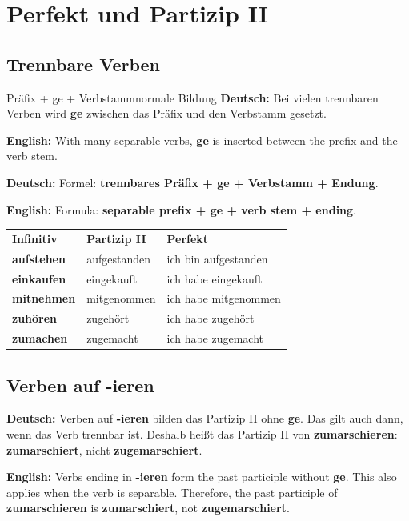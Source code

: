 \documentclass[a4paper,11pt]{article}
\newcommand{\GermanText}[1]{\textbf{Deutsch: }#1\par}
\newcommand{\EnglishText}[1]{{\small\color{SoftGray}\textbf{English: }#1\par}}
\begin{document}
    \section{Perfekt und Partizip II}

        \subsection{Trennbare Verben}

        \begin{grammarentry}{Präfix + ge + Verbstamm}{normale Bildung}
            \GermanText{Bei vielen trennbaren Verben wird \textbf{ge} zwischen das Präfix und den Verbstamm gesetzt.}
            \EnglishText{With many separable verbs, \textbf{ge} is inserted between the prefix and the verb stem.}

            \GermanText{Formel: \textbf{trennbares Präfix + ge + Verbstamm + Endung}.}
            \EnglishText{Formula: \textbf{separable prefix + ge + verb stem + ending}.}
        \end{grammarentry}

        \begin{tabularx}{\textwidth}{>{\bfseries}Y Y Y}
            \color{white}\textbf{Infinitiv} & \color{white}\textbf{Partizip II} & \color{white}\textbf{Perfekt} \\
            aufstehen & aufgestanden & ich bin aufgestanden \\
            einkaufen & eingekauft & ich habe eingekauft \\
            mitnehmen & mitgenommen & ich habe mitgenommen \\
            zuhören & zugehört & ich habe zugehört \\
            zumachen & zugemacht & ich habe zugemacht \\
        \end{tabularx}

        \subsection{Verben auf \glqq -ieren\grqq}

        \begin{warningbox}
            \GermanText{Verben auf \textbf{-ieren} bilden das Partizip II ohne \textbf{ge}. Das gilt auch dann, wenn das Verb trennbar ist. Deshalb heißt das Partizip II von \textbf{zumarschieren}: \textbf{zumarschiert}, nicht \textbf{zugemarschiert}.}
            \EnglishText{Verbs ending in \textbf{-ieren} form the past participle without \textbf{ge}. This also applies when the verb is separable. Therefore, the past participle of \textbf{zumarschieren} is \textbf{zumarschiert}, not \textbf{zugemarschiert}.}
        \end{warningbox}
\end{document}
